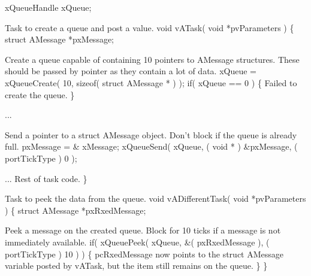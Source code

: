 \begin{DoxyPre} xQueueHandle xQueue;\end{DoxyPre}



\begin{DoxyPre}Task to create a queue and post a value.
 void vATask( void *pvParameters )
 \{
 struct AMessage *pxMessage;\end{DoxyPre}



\begin{DoxyPre}Create a queue capable of containing 10 pointers to AMessage structures.
These should be passed by pointer as they contain a lot of data.
        xQueue = xQueueCreate( 10, sizeof( struct AMessage * ) );
        if( xQueue == 0 )
        \{
Failed to create the queue.
        \}\end{DoxyPre}



\begin{DoxyPre}...\end{DoxyPre}



\begin{DoxyPre}Send a pointer to a struct AMessage object.  Don't block if the
queue is already full.
        pxMessage = \& xMessage;
        xQueueSend( xQueue, ( void * ) \&pxMessage, ( portTickType ) 0 );\end{DoxyPre}



\begin{DoxyPre}... Rest of task code.
 \}\end{DoxyPre}



\begin{DoxyPre}Task to peek the data from the queue.
 void vADifferentTask( void *pvParameters )
 \{
 struct AMessage *pxRxedMessage;
\begin{DoxyVerb}   if( xQueue != 0 )
   {
\end{DoxyVerb}

Peek a message on the created queue.  Block for 10 ticks if a
message is not immediately available.
                if( xQueuePeek( xQueue, \&( pxRxedMessage ), ( portTickType ) 10 ) )
                \{
pcRxedMessage now points to the struct AMessage variable posted
by vATask, but the item still remains on the queue.
                \}
        \}\end{DoxyPre}



